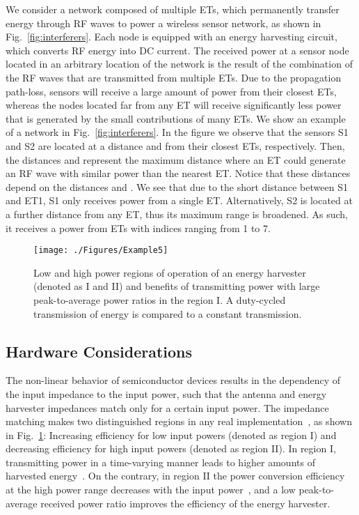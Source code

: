 \documentclass[conference]{IEEEtran}
\begin{document}
We consider a network composed of multiple ETs, which permanently transfer energy through RF waves to power a wireless sensor network, as shown in Fig.~\ref{fig:interferers}. Each node is equipped with an energy harvesting circuit, which converts RF energy into DC current. 
The received power at a sensor node located in an arbitrary location of the network is the result of the combination of the RF waves that are transmitted from multiple ETs. Due to the propagation path-loss, sensors will receive a large amount of power from their closest ETs, whereas the nodes located far from any ET will receive significantly less power that is generated by the small contributions of many ETs. 
We show an example of a network in Fig.~\ref{fig:interferers}. In the figure we observe that the sensors S1 and S2 are located at a distance  and  from their closest ETs, respectively. Then,  the distances  and  represent the maximum distance where an ET could generate an RF wave with similar power than the nearest ET. Notice that these distances depend on the distances  and . We see that due to the short distance  between S1 and ET1, S1 only receives power from a single ET.
 Alternatively, S2 is located at a further distance from any ET, thus its maximum range is broadened. As such, it receives a power from ETs with indices ranging from 1 to 7.

\begin{figure}
  \centering
    \texttt{[image: ./Figures/Example5]}
 \caption{ Low and high power regions of operation of an energy harvester (denoted as I and II) and benefits of transmitting power with large peak-to-average power ratios in the region I. A duty-cycled transmission of energy is compared to a constant transmission.}
 \label{fig:example}
 \vspace{0.0 cm}
\end{figure}


\subsection{Hardware Considerations}
The non-linear behavior of semiconductor devices results in the dependency of the input impedance to the input power, such that the antenna and energy harvester impedances match only for a certain input power.
The impedance matching makes two distinguished regions in any real implementation~\cite{kaushik-jetcas}, as shown in Fig.~\ref{fig:example}:
Increasing efficiency for low input powers (denoted as region I) and decreasing efficiency for high input powers (denoted as region II).  
In region I, transmitting power in a time-varying manner leads to higher amounts of harvested energy~\cite{cttc-wpt}.
 On the contrary, in region II the power conversion efficiency at the high power range decreases with the input power~\cite{P1110}, and a low peak-to-average received power ratio improves the efficiency of the energy harvester.     
\end{document}
